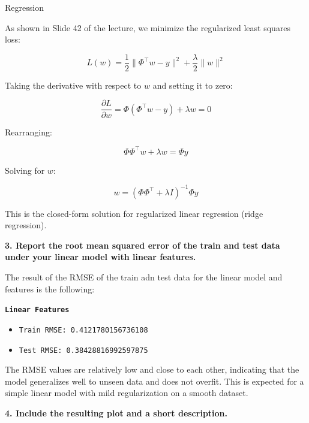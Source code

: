 \documentclass[
	english,
        solution=true
	]{tudaexercise}
\begin{document}
\begin{task}[points=34]{Regression}
\begin{subtask}[points=8, title=Linear Features]
\begin{solution}
            As shown in Slide 42 of the lecture, we minimize the regularized least squares loss:

            \[
            L(w) = \frac{1}{2} \|\Phi^\top w - y\|^2 + \frac{\lambda}{2} \|w\|^2
            \]

            Taking the derivative with respect to $w$ and setting it to zero:

            \[
            \frac{\partial L}{\partial w} = \Phi(\Phi^\top w - y) + \lambda w = 0
            \]

            Rearranging:

            \[
            \Phi \Phi^\top w + \lambda w = \Phi y
            \]

            Solving for $w$:

            \[
            w = (\Phi \Phi^\top + \lambda I)^{-1} \Phi y
            \]

            This is the closed-form solution for regularized linear regression (ridge regression).

            \vspace{2em}

            \textbf{3. Report the root mean squared error of the train and test data under your linear model with linear features.}

            The result of the RMSE of the train adn test data for the linear model and features is the following:

            \vspace{1em}

            \textbf{\texttt{Linear Features}}
            \begin{itemize}
                \item \texttt{Train RMSE: 0.4121780156736108}
                \item \texttt{Test RMSE: 0.38428816992597875}
            \end{itemize}

            \vspace{1em}

            The RMSE values are relatively low and close to each other, indicating that the model generalizes well to unseen data and does not overfit.
            This is expected for a simple linear model with mild regularization on a smooth dataset.

            \vspace{2em}

            \textbf{4. Include the resulting plot and a short description.}


\end{solution}
\end{subtask}
\end{task}
\end{document}
